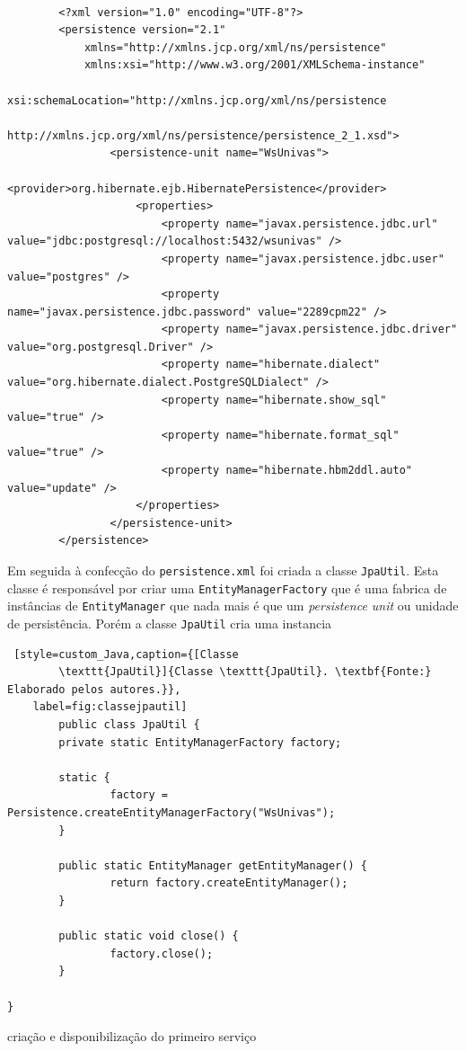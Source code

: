   \begin{lstlisting}[style=custom_XML,caption={[\texttt{persistence.xml}]
  {\texttt{persistence.xml}. \textbf{Fonte:} Elaborado pelos autores.}},
	label=fig:persistence]

		<?xml version="1.0" encoding="UTF-8"?>
		<persistence version="2.1"
			xmlns="http://xmlns.jcp.org/xml/ns/persistence" 
			xmlns:xsi="http://www.w3.org/2001/XMLSchema-instance"
			xsi:schemaLocation="http://xmlns.jcp.org/xml/ns/persistence
			http://xmlns.jcp.org/xml/ns/persistence/persistence_2_1.xsd">
				<persistence-unit name="WsUnivas">
					<provider>org.hibernate.ejb.HibernatePersistence</provider>
					<properties>
						<property name="javax.persistence.jdbc.url" value="jdbc:postgresql://localhost:5432/wsunivas" />
						<property name="javax.persistence.jdbc.user" value="postgres" />
						<property name="javax.persistence.jdbc.password" value="2289cpm22" />
						<property name="javax.persistence.jdbc.driver" value="org.postgresql.Driver" />
						<property name="hibernate.dialect" value="org.hibernate.dialect.PostgreSQLDialect" />
						<property name="hibernate.show_sql" value="true" />
						<property name="hibernate.format_sql" value="true" />
						<property name="hibernate.hbm2ddl.auto" value="update" />
					</properties>
				</persistence-unit>
		</persistence>
	\end{lstlisting}
		
			\par Em seguida à confecção do \texttt{persistence.xml} foi criada a
		classe \texttt{JpaUtil}. Esta classe é responsável por criar uma
		\texttt{EntityManagerFactory} que é uma  fabrica de instâncias de
		\texttt{EntityManager} que nada mais é que um \textit{persistence unit} ou
		unidade de persistência. Porém a classe \texttt{JpaUtil} cria uma instancia  
		
		\pagebreak
		\begin{lstlisting} [style=custom_Java,caption={[Classe
		\texttt{JpaUtil}]{Classe \texttt{JpaUtil}. \textbf{Fonte:} Elaborado pelos autores.}},
	label=fig:classejpautil] 
		public class JpaUtil {
        private static EntityManagerFactory factory;

        static {
                factory = Persistence.createEntityManagerFactory("WsUnivas");
        }

        public static EntityManager getEntityManager() {
                return factory.createEntityManager();
        }

        public static void close() {
                factory.close();
        }

}
	\end{lstlisting} 



		\par criação e disponibilização do primeiro serviço
		
		

